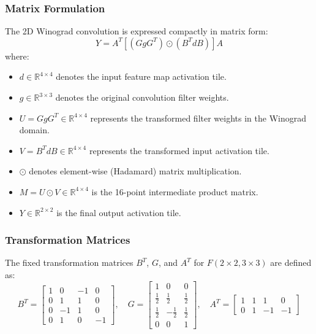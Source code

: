 \documentclass[12pt,a4paper]{article}
\begin{document}
\subsubsection{Matrix Formulation}
The 2D Winograd convolution is expressed compactly in matrix form:
\begin{equation}
    Y = A^T \left[ \left( G g G^T \right) \odot \left( B^T d B \right) \right] A
    \label{eq:winograd}
\end{equation}
where:
\begin{itemize}
    \item $d \in \mathbb{R}^{4 \times 4}$ denotes the input feature map activation tile.
    \item $g \in \mathbb{R}^{3 \times 3}$ denotes the original convolution filter weights.
    \item $U = G g G^T \in \mathbb{R}^{4 \times 4}$ represents the transformed filter weights in the Winograd domain.
    \item $V = B^T d B \in \mathbb{R}^{4 \times 4}$ represents the transformed input activation tile.
    \item $\odot$ denotes element-wise (Hadamard) matrix multiplication.
    \item $M = U \odot V \in \mathbb{R}^{4 \times 4}$ is the 16-point intermediate product matrix.
    \item $Y \in \mathbb{R}^{2 \times 2}$ is the final output activation tile.
\end{itemize}

\subsubsection{Transformation Matrices}
The fixed transformation matrices $B^T$, $G$, and $A^T$ for $F(2 \times 2, 3 \times 3)$ are defined as:
\begin{equation}
    B^T = \begin{bmatrix}
        1 & 0  & -1 & 0  \\
        0 & 1  & 1  & 0  \\
        0 & -1 & 1  & 0  \\
        0 & 1  & 0  & -1
    \end{bmatrix}, \quad
    G = \begin{bmatrix}
        1           & 0            & 0           \\
        \frac{1}{2} & \frac{1}{2}  & \frac{1}{2} \\
        \frac{1}{2} & -\frac{1}{2} & \frac{1}{2} \\
        0           & 0            & 1
    \end{bmatrix}, \quad
    A^T = \begin{bmatrix}
        1 & 1 & 1  & 0  \\
        0 & 1 & -1 & -1
    \end{bmatrix}
\end{equation}
\end{document}
